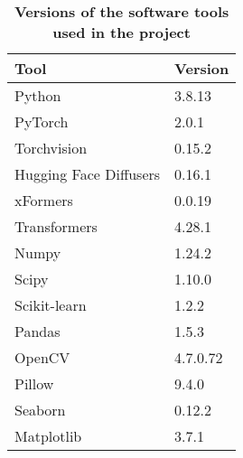 \begin{table}[ht]
\centering
\begin{tabular}{|l|l|}
\hline
\rowcolor[HTML]{BFBFBF} 
\textbf{Tool} & \textbf{Version} \\ \hline
\rowcolor[HTML]{FFFFFF} 
Python & 3.8.13 \\ \hline
\rowcolor[HTML]{FFFFFF} 
PyTorch & 2.0.1 \\ \hline
\rowcolor[HTML]{FFFFFF} 
Torchvision & 0.15.2 \\ \hline
\rowcolor[HTML]{FFFFFF} 
Hugging Face Diffusers & 0.16.1 \\ \hline
\rowcolor[HTML]{FFFFFF} 
xFormers & 0.0.19 \\ \hline
\rowcolor[HTML]{FFFFFF} 
Transformers & 4.28.1 \\ \hline
\rowcolor[HTML]{FFFFFF} 
Numpy & 1.24.2 \\ \hline
\rowcolor[HTML]{FFFFFF} 
Scipy & 1.10.0 \\ \hline
\rowcolor[HTML]{FFFFFF} 
Scikit-learn & 1.2.2 \\ \hline
\rowcolor[HTML]{FFFFFF} 
Pandas & 1.5.3 \\ \hline
\rowcolor[HTML]{FFFFFF} 
OpenCV & 4.7.0.72 \\ \hline
\rowcolor[HTML]{FFFFFF} 
Pillow & 9.4.0 \\ \hline
\rowcolor[HTML]{FFFFFF} 
Seaborn & 0.12.2 \\ \hline
\rowcolor[HTML]{FFFFFF} 
Matplotlib & 3.7.1 \\ \hline
\end{tabular}
\caption{\textbf{Versions of the software tools used in the project}}
\label{table:TableHSoftware}
\end{table}